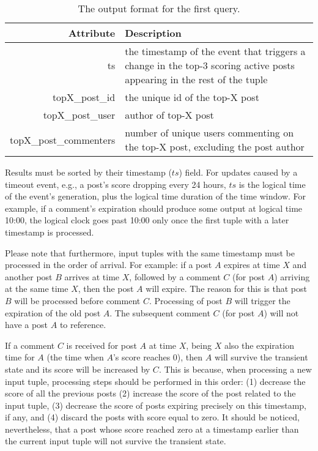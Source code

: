 \documentclass{sig-alternate}
\begin{document}
\begin{table}[ht]
	\caption{The output format for the first query.}
	\centering 
	\begin{tabular}{r p{5.2cm}}
		\toprule
		Attribute		&	 Description\\
		\midrule
		ts			&	the timestamp of the event that triggers a change in the top-3 scoring active posts appearing in the rest of the tuple\\[2ex]
		topX\_post\_id	&	the unique id of the top-X post\\[2ex]		
		topX\_post\_user	& 	 author of top-X post\\[2ex]		
		topX\_post\_commenters & number of unique users commenting on the top-X post, excluding the post author\\[2ex]
		\bottomrule 
	\end{tabular}
	\label{table:query1}
\end{table}

Results must be sorted by their timestamp ($ts$) field. For updates caused by a timeout event, e.g., a post's score dropping every 24 hours, $ts$ is the logical time of the event's generation, plus the logical time duration of the time window. For example, if a comment's expiration should produce some output at logical time 10:00, the logical clock goes past 10:00 only once the first tuple with a later timestamp is processed.

Please note that furthermore, input tuples with the same timestamp must be processed in the order of arrival. For example: if a post $A$ expires at time $X$ and another post $B$ arrives at time $X$, followed by a comment $C$ (for post $A$) arriving at the same time $X$, then the post $A$ will expire. The reason for this is that post $B$ will be processed before comment $C$. Processing of post $B$ will trigger the expiration of the old post $A$. The subsequent comment $C$ (for post $A$) will not have a post $A$ to reference.

If a comment $C$ is received for post $A$ at time $X$, being $X$ also the expiration time for $A$ (the time when $A$'s score reaches 0), then $A$ will survive the transient state and its score will be increased by $C$. This is because, when processing a new input tuple, processing steps should be performed in this order: (1) decrease the score of all the previous posts (2) increase the score of the post related to the input tuple, (3) decrease the score of posts expiring precisely on this timestamp, if any, and (4) discard the posts with score equal to zero. It should be noticed, nevertheless, that a post whose score reached zero at a timestamp earlier than the current input tuple will not survive the transient state.
\end{document}

